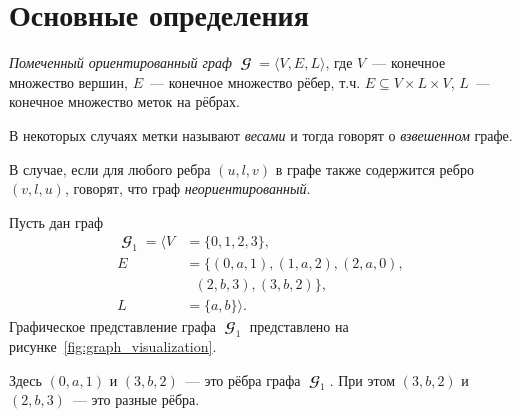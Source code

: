 \section{Основные определения}
\label{sec:GraphTheoryBasicDefinitions}

\begin{definition}
    \emph{Помеченный ориентированный граф} $\mbfscrG = \langle V, E, L \rangle$, где $V$~--- конечное множество вершин, $E$~--- конечное множество рёбер, т.ч. $E \subseteq V \times L \times V$, $L$~--- конечное множество меток на рёбрах.
\end{definition}

В некоторых случаях метки называют \emph{весами}%
    и тогда говорят о \emph{взвешенном} графе.

\begin{definition}
    В случае, если для любого ребра $(u, l, v)$ в графе также содержится ребро $(v, l, u)$, говорят, что граф \emph{неориентированный}.
\end{definition}

\begin{example}\label{exmpl:graph_visualization}
    Пусть дан граф
    \begin{align*}
        \mbfscrG_1 = \langle V & =\{0, 1, 2, 3\},                    \\
        E                      & =\{(0, a, 1), (1, a, 2), (2, a, 0), \\
                               & \ \ \ (2, b, 3), (3, b, 2)\},       \\
        L                      & =\{a, b\} \rangle.
    \end{align*}
    Графическое представление графа $\mbfscrG_1$ представлено на рисунке~\ref{fig:graph_visualization}.
    \begin{marginfigure}
        \begin{center}
            \resizebox{\marginparwidth}{!}{}
        \end{center}
        \caption{Визуальное представление графа из примера~\ref{exmpl:graph_visualization}}
        \label{fig:graph_visualization}
    \end{marginfigure}

    Здесь $(0, a, 1)$ и $(3,b,2)$~--- это рёбра графа $\mbfscrG_1$.
    При этом $(3, b, 2)$ и $(2, b, 3)$~--- это разные рёбра.
\end{example}

